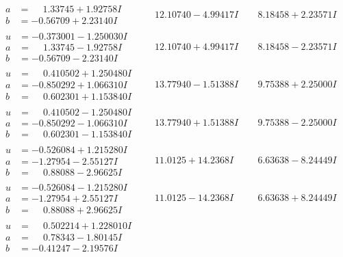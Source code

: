 \documentclass[1p]{elsarticle_modified}
\theoremstyle{definition}
\begin{document}
$$\begin{array}{c|c|c}
\begin{aligned}
a &= \phantom{-}1.33745 + 1.92758 I \\
b &= -0.56709 + 2.23140 I\end{aligned}
 & \phantom{-}12.10740 - 4.99417 I & \phantom{-}8.18458 + 2.23571 I \\ \hline\begin{aligned}
u &= -0.373001 - 1.250030 I \\
a &= \phantom{-}1.33745 - 1.92758 I \\
b &= -0.56709 - 2.23140 I\end{aligned}
 & \phantom{-}12.10740 + 4.99417 I & \phantom{-}8.18458 - 2.23571 I \\ \hline\begin{aligned}
u &= \phantom{-}0.410502 + 1.250480 I \\
a &= -0.850292 + 1.066310 I \\
b &= \phantom{-}0.602301 + 1.153840 I\end{aligned}
 & \phantom{-}13.77940 - 1.51388 I & \phantom{-}9.75388 + 2.25000 I \\ \hline\begin{aligned}
u &= \phantom{-}0.410502 - 1.250480 I \\
a &= -0.850292 - 1.066310 I \\
b &= \phantom{-}0.602301 - 1.153840 I\end{aligned}
 & \phantom{-}13.77940 + 1.51388 I & \phantom{-}9.75388 - 2.25000 I \\ \hline\begin{aligned}
u &= -0.526084 + 1.215280 I \\
a &= -1.27954 - 2.55127 I \\
b &= \phantom{-}0.88088 - 2.96625 I\end{aligned}
 & \phantom{-}11.0125 + 14.2368 I & \phantom{-}6.63638 - 8.24449 I \\ \hline\begin{aligned}
u &= -0.526084 - 1.215280 I \\
a &= -1.27954 + 2.55127 I \\
b &= \phantom{-}0.88088 + 2.96625 I\end{aligned}
 & \phantom{-}11.0125 - 14.2368 I & \phantom{-}6.63638 + 8.24449 I \\ \hline\begin{aligned}
u &= \phantom{-}0.502214 + 1.228010 I \\
a &= \phantom{-}0.78343 - 1.80145 I \\
b &= -0.41247 - 2.19576 I\end{aligned}

\end{array}$$
\end{document}
